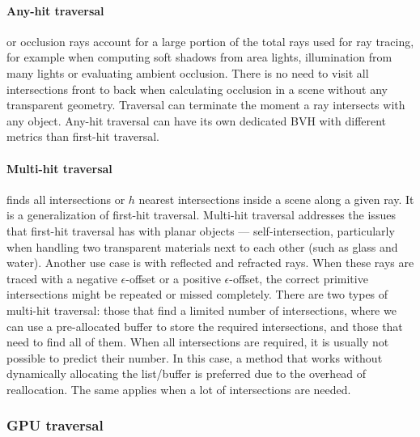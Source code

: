 \paragraph{Any-hit traversal} or occlusion rays account for a large portion of the total rays used for ray tracing, for example when computing soft shadows from area lights, illumination from many lights or evaluating ambient occlusion. There is no need to visit all intersections front to back when calculating occlusion in a scene without any transparent geometry. Traversal can terminate the moment a ray intersects with any object. Any-hit traversal can have its own dedicated BVH with different metrics than first-hit traversal. \cite{Meister2021}

\paragraph{Multi-hit traversal} finds all intersections or $h$ nearest intersections inside a scene along a given ray. It is a generalization of first-hit traversal. Multi-hit traversal addresses the issues that first-hit traversal has with planar objects — self-intersection, particularly when handling two transparent materials next to each other (such as glass and water). Another use case is with reflected and refracted rays. When these rays are traced with a negative $\epsilon$-offset or a positive $\epsilon$-offset, the correct primitive intersections might be repeated or missed completely. There are two types of multi-hit traversal: those that find a limited number of intersections, where we can use a pre-allocated buffer to store the required intersections, and those that need to find all of them. When all intersections are required, it is usually not possible to predict their number. In this case, a method that works without dynamically allocating the list/buffer is preferred due to the overhead of reallocation. The same applies when a lot of intersections are needed. \cite{Meister2021}

\subsubsection{GPU traversal}

